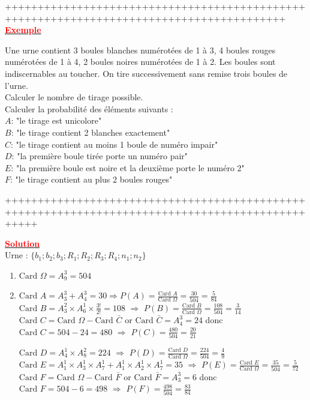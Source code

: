 \documentclass[12pt,a4paper]{article}
\begin{document}
+++++++++++++++++++++++++++++++++++++++++++++++++++++++++++++++++++++++++++++++++++++++++\\

\underline{\textbf{\textcolor{red}{Exemple}}}

Une urne contient 3 boules blanches numérotées de 1 à 3, 4 boules rouges numérotées de 1 à 4, 2 boules noires numérotées de 1 à 2. Les boules sont indiscernables au toucher. On tire successivement sans remise trois boules de l'urne. \\
Calculer le nombre de tirage possible. \\
Calculer la probabilité des éléments suivants : \\
$A$: "le tirage est unicolore" \\
$B$: "le tirage contient 2 blanches exactement" \\
$C$: "le tirage contient au moins 1 boule de numéro impair" \\
$D$: "la première boule tirée porte un numéro pair" \\
$E$: "la première boule est noire et la deuxième porte le numéro 2" \\
$F$: "le tirage contient au plus 2 boules rouges"

+++++++++++++++++++++++++++++++++++++++++++++++++++++++++++++++++++++++++++++++++++++++++++++++++

\underline{\textbf{\textcolor{red}{Solution}}}\\
Urne : $\{b_1; b_2; b_3; R_1; R_2; R_3; R_4; n_1; n_2\}$
\begin{enumerate}
    \item $\text{Card } \Omega = A_9^3 = 504$
    \item 
    $\text{Card } A = A_3^3 + A_4^3 = 30 \Rightarrow P(A) = \frac{\text{Card } A}{\text{Card } \Omega} = \frac{30}{504} = \frac{5}{84}$ \\
    
    $\text{Card } B = A_3^2 \times A_6^1 \times \frac{3!}{2!} = 108$ $\Rightarrow$
    $P(B) = \frac{\text{Card } B}{\text{Card } \Omega} = \frac{108}{504} = \frac{3}{14}$ \\
    
    $\text{Card } C = \text{Card } \Omega - \text{Card } \bar{C}$ or
    $\text{Card } \bar{C} = A_4^3 = 24$ donc
    $\text{Card } C = 504 - 24 = 480$ $\Rightarrow$
    $P(C) = \frac{480}{504} = \frac{20}{21}$ 
    
    $\text{Card } D = A_4^1 \times A_8^2 = 224$ $\Rightarrow$
    $P(D) = \frac{\text{Card } D}{\text{Card } \Omega} = \frac{224}{504} = \frac{4}{9}$ \\
    
    $\text{Card } E = A_1^1 \times A_3^1 \times A_7^1 + A_1^1 \times A_2^1 \times A_7^1 = 35$ $\Rightarrow$
    $P(E) = \frac{\text{Card } E}{\text{Card } \Omega} = \frac{35}{504} = \frac{5}{72}$ \\
    
    $\text{Card } F = \text{Card } \Omega - \text{Card } \bar{F}$ or
    $\text{Card } \bar{F} = A_3^3 = 6$ donc
    $\text{Card } F = 504 - 6 = 498$ $\Rightarrow$
    $P(F) = \frac{498}{504} = \frac{83}{84}$
\end{enumerate}
\end{document}
